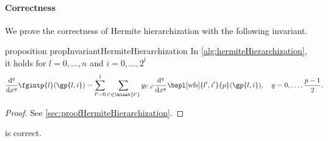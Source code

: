 \paragraph{Correctness}

We prove the correctness of Hermite hierarchization
with the following invariant.

\begin{restatable}{%
  proposition%
}{%
  propInvariantHermiteHierarchization%
}
  \label{prop:invariantHermiteHierarchization}
  In \cref{alg:hermiteHierarchization}, it holds
  for $l = 0, \dotsc, n$ and $i = 0, \dotsc, 2^l$
  \begin{equation}
    \label{eq:propInvariantHermiteHierarchization}
    \frac{\diff^q}{\dx^q} \fgintp{l}(\gp{l,i})
    = \sum_{l'=0}^l \sum_{i' \in \hiset{l'}}
    \linout{l',i'} \frac{\diff^q}{\dx^q}
    \bspl[\wfs]{l',i'}{p}(\gp{l,i}),\quad
    q = 0, \dotsc, \frac{p-1}{2}.
    \hspace*{-6mm}
  \end{equation}
\end{restatable}

\begin{proof}
  See \cref{sec:proofHermiteHierarchization}.
\end{proof}

\begin{shortcorollary}
  \label{cor:algHermiteHierarchizationCorrectness}
   is correct.
\end{shortcorollary}


